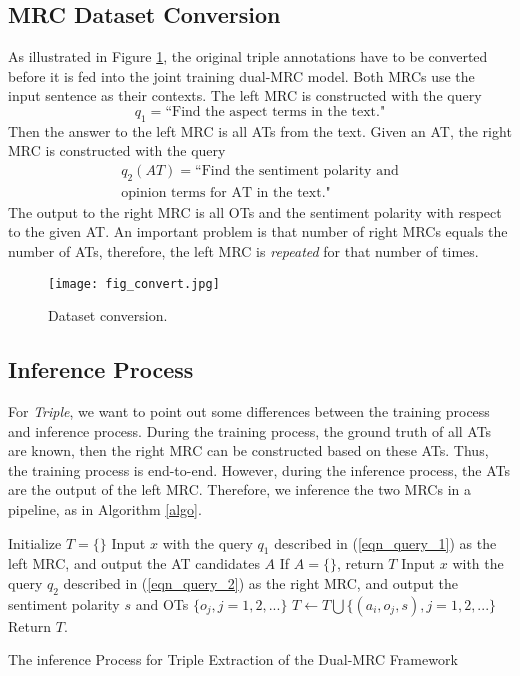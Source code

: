 \documentclass[letterpaper]{article} \usepackage{aaai21}  \usepackage{times}  \usepackage{helvet} \usepackage{courier}  \usepackage[hyphens]{url}  \usepackage{graphicx} \urlstyle{rm} \def\UrlFont{\rm}  \usepackage{natbib}  \usepackage{caption}
\begin{document}
\subsection{MRC Dataset Conversion}
As illustrated in Figure \ref{fig_convert}, the original triple annotations have to be converted before it is fed into
the joint training dual-MRC model. Both MRCs use the input sentence as their contexts.
The left MRC is constructed with the query 
\begin{equation}
    q_1 = \text{``Find the aspect terms in the text."} \label{eqn_query_1}
\end{equation}
Then the answer to the left MRC is all ATs from the text.  
Given an AT, the right MRC is constructed with the query
\begin{eqnarray}
    q_2(AT) = \text{``Find the sentiment polarity and} \nonumber \\ 
    \text{opinion terms for AT in the text."} \label{eqn_query_2}
\end{eqnarray}
The output to the right MRC is all OTs and the sentiment polarity with respect to the given AT. 
An important problem is that number of right MRCs equals the number of ATs, therefore, the left MRC is \emph{repeated} for that number of times. 
\begin{figure}
    \centering
    \texttt{[image: fig\_convert.jpg]}
    \caption{Dataset conversion.} \label{fig_convert}
\end{figure}



\subsection{Inference Process}
For \emph{Triple}, we want to point out some differences between the training process and inference process.
During the training process, the ground truth of all ATs are known, then the right MRC can be constructed based on these ATs. 
Thus, the training process is end-to-end.
However, during the inference process, the ATs are the output of the left MRC.
Therefore, we inference the two MRCs in a pipeline, as in Algorithm \ref{algo}.
\begin{algorithm}
    \SetAlgoLined
    Initialize $T=\{\}$\;
    Input $x$ with the query $q_1$ described in (\ref{eqn_query_1}) as the left MRC, and output the AT candidates $A$\;
    If $A = \{\}$, return $T$\;
    {
        Input $x$ with the query $q_2$ described in (\ref{eqn_query_2}) as the right MRC, 
        and output the sentiment polarity $s$ and OTs $\{o_j, j= 1,2,...\}$\;
        $T \leftarrow T \bigcup \{(a_i, o_j, s),j=1,2,...\}$
    }
    Return $T$.
     \caption{The inference Process for Triple Extraction of the Dual-MRC Framework} \label{algo}
\end{algorithm}
\end{document}
